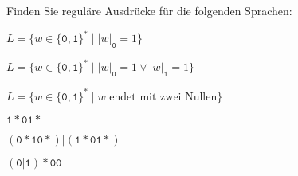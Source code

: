 Finden Sie reguläre Ausdrücke für die folgenden Sprachen:
\begin{teilaufgaben}
\item
$L=\{w\in\{\texttt{0},\texttt{1}\}^*\mid |w|_{\texttt{0}}=1\}$
\item
$L=\{w\in\{\texttt{0},\texttt{1}\}^*\mid |w|_{\texttt{0}}=1\vee |w|_{\texttt{1}}=1\}$
\item
$L=\{w\in\{\texttt{0},\texttt{1}\}^*\mid \text{$w$ endet mit zwei Nullen}\}$
\end{teilaufgaben}


\begin{loesung}
\begin{teilaufgaben}
\item $\texttt{1}{*}\texttt{0}\texttt{1}*$
\item $
(\texttt{0}{*}\texttt{1}\texttt{0}*)|(\texttt{1}{*}\texttt{0}\texttt{1}*)
$
\item $(\texttt{0}|\texttt{1}){*}\texttt{00}$
\qedhere
\end{teilaufgaben}
\end{loesung}
